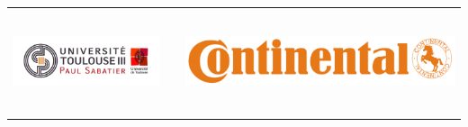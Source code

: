 \begin{titlepage}
\BgThispage
{}
\begin{tabular}{cp{1.8cm}c}
	\begin{minipage}{0.4\textwidth}
		\vspace{-40px}
		\hspace{-35px}
		\includegraphics[height=3cm]{styles/images/logos/ups.jpg}
	\end{minipage}
	&
	&
	\begin{minipage}{0.4\textwidth}
		\vspace{-40px}
		\includegraphics[height=3cm]{styles/images/logos/conti.png}
	\end{minipage}
	\\
\end{tabular}


\end{titlepage}
